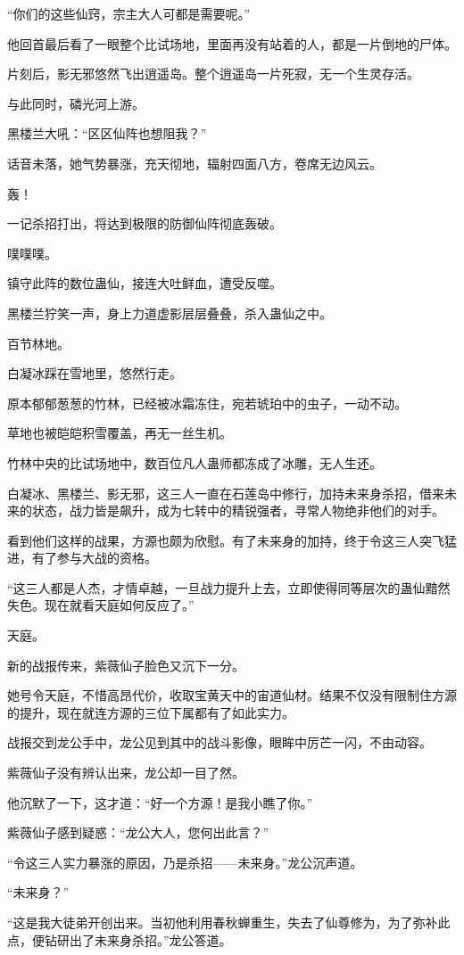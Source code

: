 \begin{this_body}
“你们的这些仙窍，宗主大人可都是需要呢。”

他回首最后看了一眼整个比试场地，里面再没有站着的人，都是一片倒地的尸体。

片刻后，影无邪悠然飞出逍遥岛。整个逍遥岛一片死寂，无一个生灵存活。

与此同时，磷光河上游。

黑楼兰大吼：“区区仙阵也想阻我？”

话音未落，她气势暴涨，充天彻地，辐射四面八方，卷席无边风云。

轰！

一记杀招打出，将达到极限的防御仙阵彻底轰破。

噗噗噗。

镇守此阵的数位蛊仙，接连大吐鲜血，遭受反噬。

黑楼兰狞笑一声，身上力道虚影层层叠叠，杀入蛊仙之中。

百节林地。

白凝冰踩在雪地里，悠然行走。

原本郁郁葱葱的竹林，已经被冰霜冻住，宛若琥珀中的虫子，一动不动。

草地也被皑皑积雪覆盖，再无一丝生机。

竹林中央的比试场地中，数百位凡人蛊师都冻成了冰雕，无人生还。

白凝冰、黑楼兰、影无邪，这三人一直在石莲岛中修行，加持未来身杀招，借来未来的状态，战力皆是飙升，成为七转中的精锐强者，寻常人物绝非他们的对手。

看到他们这样的战果，方源也颇为欣慰。有了未来身的加持，终于令这三人突飞猛进，有了参与大战的资格。

“这三人都是人杰，才情卓越，一旦战力提升上去，立即使得同等层次的蛊仙黯然失色。现在就看天庭如何反应了。”

天庭。

新的战报传来，紫薇仙子脸色又沉下一分。

她号令天庭，不惜高昂代价，收取宝黄天中的宙道仙材。结果不仅没有限制住方源的提升，现在就连方源的三位下属都有了如此实力。

战报交到龙公手中，龙公见到其中的战斗影像，眼眸中厉芒一闪，不由动容。

紫薇仙子没有辨认出来，龙公却一目了然。

他沉默了一下，这才道：“好一个方源！是我小瞧了你。”

紫薇仙子感到疑惑：“龙公大人，您何出此言？”

“令这三人实力暴涨的原因，乃是杀招——未来身。”龙公沉声道。

“未来身？”

“这是我大徒弟开创出来。当初他利用春秋蝉重生，失去了仙尊修为，为了弥补此点，便钻研出了未来身杀招。”龙公答道。


\end{this_body}
